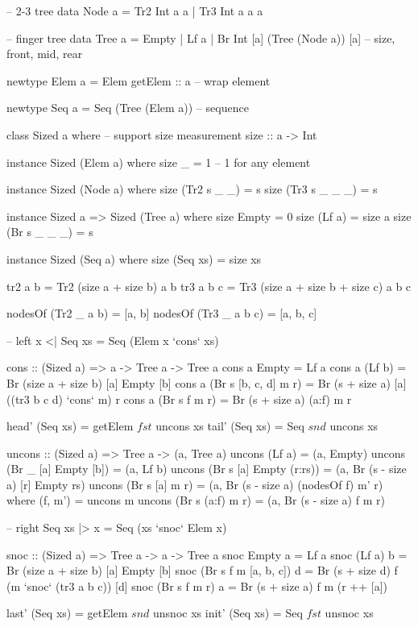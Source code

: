 \documentclass[b5paper]{article}
\begin{document}
\begin{Haskell}
-- 2-3 tree
data Node a = Tr2 Int a a
            | Tr3 Int a a a

-- finger tree
data Tree a = Empty
            | Lf a
            | Br Int [a] (Tree (Node a)) [a] -- size, front, mid, rear

newtype Elem a = Elem { getElem :: a } -- wrap element

newtype Seq a = Seq (Tree (Elem a)) -- sequence

class Sized a where  -- support size measurement
  size :: a -> Int

instance Sized (Elem a) where
  size _ = 1  -- 1 for any element

instance Sized (Node a) where
  size (Tr2 s _ _) = s
  size (Tr3 s _ _ _) = s

instance Sized a => Sized (Tree a) where
  size Empty = 0
  size (Lf a) = size a
  size (Br s _ _ _) = s

instance Sized (Seq a) where
  size (Seq xs) = size xs

tr2 a b = Tr2 (size a + size b) a b
tr3 a b c = Tr3 (size a + size b + size c) a b c

nodesOf (Tr2 _ a b) = [a, b]
nodesOf (Tr3 _ a b c) = [a, b, c]

-- left
x <| Seq xs = Seq (Elem x `cons` xs)

cons :: (Sized a) => a -> Tree a -> Tree a
cons a Empty = Lf a
cons a (Lf b) = Br (size a + size b) [a] Empty [b]
cons a (Br s [b, c, d] m r) = Br (s + size a) [a] ((tr3 b c d) `cons` m) r
cons a (Br s f m r) = Br (s + size a) (a:f) m r

head' (Seq xs) = getElem $ fst $ uncons xs
tail' (Seq xs) = Seq $ snd $ uncons xs

uncons :: (Sized a) => Tree a -> (a, Tree a)
uncons (Lf a) = (a, Empty)
uncons (Br _ [a] Empty [b]) = (a, Lf b)
uncons (Br s [a] Empty (r:rs)) = (a, Br (s - size a) [r] Empty rs)
uncons (Br s [a] m r) = (a, Br (s - size a) (nodesOf f) m' r)
    where (f, m') = uncons m
uncons (Br s (a:f) m r) = (a, Br (s - size a) f m r)

-- right
Seq xs |> x  = Seq (xs `snoc` Elem x)

snoc :: (Sized a) => Tree a -> a -> Tree a
snoc Empty a = Lf a
snoc (Lf a) b = Br (size a + size b) [a] Empty [b]
snoc (Br s f m [a, b, c]) d = Br (s + size d) f (m `snoc` (tr3 a b c)) [d]
snoc (Br s f m r) a = Br (s + size a) f m (r ++ [a])

last' (Seq xs) = getElem $ snd $ unsnoc xs
init' (Seq xs) = Seq $ fst $ unsnoc xs


\end{Haskell}
\end{document}
